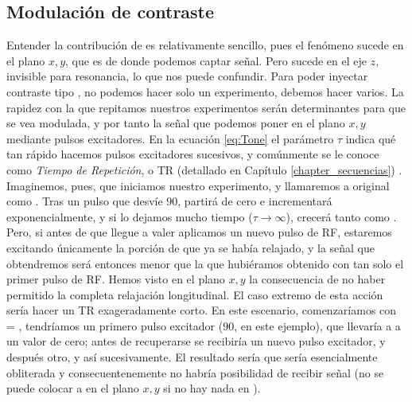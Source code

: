 \subsection{Modulación de contraste \Tone}
Entender la contribución de \Ttwo es relativamente sencillo, pues el fenómeno sucede en el plano $x,y$, que es de donde podemos captar señal. Pero \Tone sucede en el eje $z$, invisible para resonancia, lo que nos puede confundir. Para poder inyectar contraste tipo \Tone, no podemos hacer solo un experimento, debemos hacer varios. La rapidez con la que repitamos nuestros experimentos serán determinantes para que \Mz se vea modulada, y por tanto la señal que podemos poner en el plano $x,y$ mediante pulsos excitadores. En la ecuación \ref{eq:Tone} el parámetro $\tau$ indica qué tan rápido hacemos pulsos excitadores sucesivos, y comúnmente se le conoce como \textit{Tiempo de Repetición}, o TR (detallado en Capítulo \ref{chapter_secuencias}) . Imaginemos, pues, que iniciamos nuestro experimento, y llamaremos a \Mz original como \Mzero. Tras un pulso que desvíe 90\degrees, \Mz partirá de cero e incrementará exponencialmente, y si lo dejamos mucho tiempo ($\tau\xrightarrow{}\infty$), crecerá tanto como \Mzero. Pero, si antes de que \Mz llegue a valer \Mzero aplicamos un nuevo pulso de RF, estaremos excitando únicamente la porción de \Mz que ya se había relajado, y la señal que obtendremos será entonces menor que la que hubiéramos obtenido con tan solo el primer pulso de RF. Hemos visto en el plano $x,y$ la consecuencia de no haber permitido la completa relajación longitudinal. El caso extremo de esta acción sería hacer un TR exageradamente corto. En este escenario, comenzaríamos con \Mz = \Mzero, tendríamos un primero pulso excitador (90\degrees, en este ejemplo), que llevaría a \Mz a un valor de cero; antes de recuperarse \Mz se recibiría un nuevo pulso excitador, y después otro, y así sucesivamente. El resultado sería que \Mz sería esencialmente obliterada y consecuentenemente no habría posibilidad de recibir señal (no se puede colocar a \M en el plano $x,y$ si no hay nada en \Mz). 

